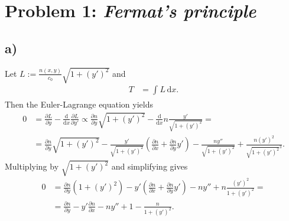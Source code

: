 \documentclass[english, parskip=full]{scrartcl}
\title{\titel}
\author{\autor}
\date{\today}
\newcommand{\intx}{}
\newcommand{\kla}{}
\newcommand{\tecxt}{}
\begin{document}
\maketitle  %

\section*{Problem 1: \normalfont\textit{\large{Fermat's principle}}}
\subsection*{a)}
Let $L:=\frac{n(x,y)}{c_0}\sqrt{1+(y')^2}$ and 
\begin{align}
T&=\intx\int_{ }^{ }L\, \mathrm{d}x.
\end{align}
Then the Euler-Lagrange equation yields
\begin{align}
0&=\frac{\partial L}{\partial y}-\frac{\tecxt\text{d}}{\tecxt\text{d}x}\frac{\partial L}{\partial y'}\propto\frac{\partial n}{\partial y}\sqrt{1+(y')^2}-\frac{\tecxt\text{d}}{\tecxt\text{d}x}n\frac{y'}{\sqrt{1+(y')^2}}=\\
&=\frac{\partial n}{\partial y}\sqrt{1+(y')^2}-\frac{y'}{\sqrt{1+(y')^2}}\kla\left( \frac{\partial n}{\partial x}+\frac{\partial n}{\partial y}y' \right)-\frac{ny''}{\sqrt{1+(y')^2}}+\frac{n(y')^2}{\sqrt{1+(y')^2}^3}.
\end{align}
Multiplying by $\sqrt{1+(y')^2}$ and simplifying gives
\begin{align}
0&=\frac{\partial n}{\partial y}\kla\left( 1+(y')^2 \right)-y'\kla\left( \frac{\partial n}{\partial x}+\frac{\partial n}{\partial y}y' \right)-ny''+n\frac{(y')^2}{1+(y')^2}=\\
&=\frac{\partial n}{\partial y}-y'\frac{\partial n}{\partial x}-ny''+1-\frac{n}{1+(y')^2}.
\end{align}
\end{document}

